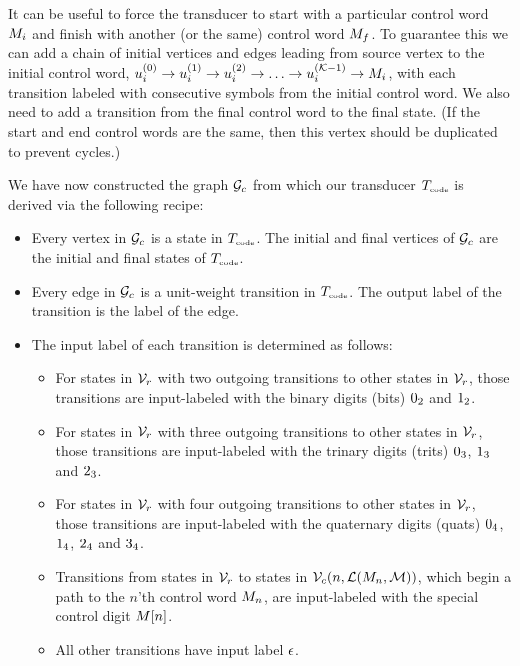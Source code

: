 \documentclass[english]{article}
\begin{document}
It can be useful to force the transducer to start with a particular control word $M_i$
and finish with another (or the same) control word $M_f$.
To guarantee this we can add a chain of initial vertices and edges leading from source vertex to the initial control word,
$u^{(0)}_i \to u^{(1)}_i \to u^{(2)}_i \to \ldots \to u^{({\cal K}-1)}_i \to M_i$,
with each transition labeled with consecutive symbols from the initial control word.
We also need to add a transition from the final control word to the final state.
(If the start and end control words are the same, then this vertex should be duplicated to prevent cycles.)

We have now constructed the graph ${\cal G}_c$ from which our transducer $T_{\mbox{\tiny code}}$
is derived via the following recipe:
\begin{itemize}
\item Every vertex in ${\cal G}_c$ is a state in $T_{\mbox{\tiny code}}$.
The initial and final vertices of ${\cal G}_c$ are the initial and final states of $T_{\mbox{\tiny code}}$.
\item Every edge in ${\cal G}_c$ is a unit-weight transition in $T_{\mbox{\tiny code}}$.
The output label of the transition is the label of the edge.
\item The input label of each transition is determined as follows:
\begin{itemize}
\item For states in ${\cal V}_r$ with two outgoing transitions to other states in ${\cal V}_r$, those transitions are input-labeled with the binary digits (bits) $0_2$ and $1_2$.
\item For states in ${\cal V}_r$ with three outgoing transitions to other states in ${\cal V}_r$, those transitions are input-labeled with the trinary digits (trits) $0_3$, $1_3$ and $2_3$.
\item For states in ${\cal V}_r$ with four outgoing transitions to other states in ${\cal V}_r$, those transitions are input-labeled with the quaternary digits (quats) $0_4$, $1_4$, $2_4$ and $3_4$.
\item Transitions from states in ${\cal V}_r$ to states in ${\cal V}_c(n,{\cal L}(M_n,{\cal M}))$,
which begin a path to the $n$'th control word $M_n$,
are input-labeled with the special control digit $M[{n}]$.
\item All other transitions have input label $\epsilon$.
\end{itemize}
\end{itemize}
\end{document}

